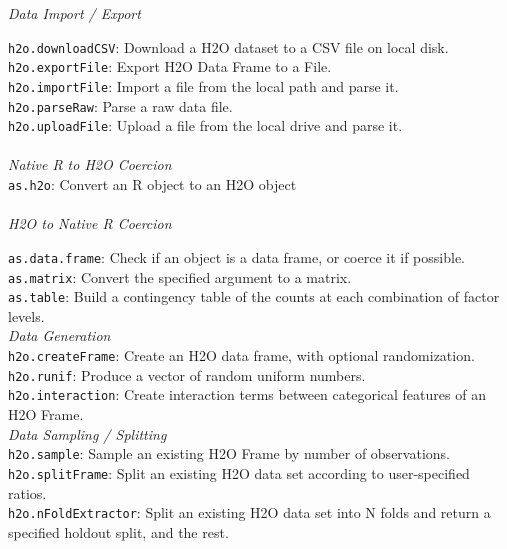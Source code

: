 \documentclass[11pt]{article}
\begin{document}
\begin{enumerate}
\textit{Data Import / Export}

{\texttt{h2o.downloadCSV}}: Download a H2O dataset to a CSV file on local disk.\\
{\texttt{h2o.exportFile}}: Export H2O Data Frame to a File.\\
 {\texttt{h2o.importFile}}: Import a file from the local path and parse it.\\
 {\texttt{h2o.parseRaw}}: Parse a raw data file.\\
 {\texttt{h2o.uploadFile}}: Upload a file from the local drive and parse it.\\

\\
\textit{Native R to H2O Coercion}\\

{\texttt{as.h2o}}: Convert an R object to an H2O object\\

\\
\textit{H2O to Native R Coercion}

{\texttt{as.data.frame}}: Check if an object is a data frame, or coerce it if possible.\\
{\texttt{as.matrix}}: Convert the specified argument to a matrix.\\
 {\texttt{as.table}}: Build a contingency table of the counts at each combination of factor levels.\\

\textit{Data Generation}\\

{\texttt{h2o.createFrame}}: Create an H2O data frame, with optional randomization.\\
{\texttt{h2o.runif}}: Produce a vector of random uniform numbers.\\
{\texttt{h2o.interaction}}: Create interaction terms between categorical features of an H2O Frame.\\

\textit{Data Sampling / Splitting}\\

 {\texttt{h2o.sample}}: Sample an existing H2O Frame by number of observations.\\
{\texttt{h2o.splitFrame}: Split an existing H2O data set according to user-specified ratios.\\
{\texttt{h2o.nFoldExtractor}}: Split an existing H2O data set into N folds and return a specified holdout split, and the rest.\\

}
\end{enumerate}
\end{document}
